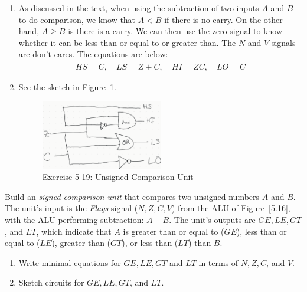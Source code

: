 \documentclass[12pt]{article}
\newenvironment{ex}[2][Exercise]{\begin{trivlist}
		\item[\hskip \labelsep {\bfseries #1}\hskip \labelsep {\bfseries #2.}]}{\end{trivlist}}
\newenvironment{sol}[1][Solution]{\begin{trivlist}
		\item[\hskip \labelsep {\bfseries #1:}]}{\end{trivlist}}
\begin{document}
\begin{sol}
	\begin{enumerate}[label=(\alph*)]
		\item As discussed in the text, when using the subtraction of two inputs
		$A$ and $B$ to do comparison, we know that $A<B$ if there is no carry.
		On the other hand, $A\geq B$ is there is a carry. We can then use
		the zero signal to know whether it can be less than or equal to or greater
		than. The $N$ and $V$ signals are don't-cares. The equations are below:
		\begin{align*}
			HS=C,\quad LS=Z+C,\quad HI=\bar{Z}C,\quad LO=\bar{C}
		\end{align*}
		\item See the sketch in Figure~\ref{unsigned-comparison-unit}.
		\begin{figure}
			\centering
			\includegraphics[width=0.5\textwidth]{exercise-05-19-unsigned-comparison-unit}
			\caption{Exercise 5-19: Unsigned Comparison Unit}
			\label{unsigned-comparison-unit}
		\end{figure}
	\end{enumerate}
\end{sol}

\begin{ex}{5.20}
	Build an \emph{signed comparison unit} that compares two unsigned numbers $A$ and $B$.
	The unit's input is the \emph{Flags} signal ($N, Z, C, V$) from the ALU of
	Figure~\ref{5.16}, with the ALU performing subtraction: $A-B$. The unit's outputs
	are $GE, LE, GT$, and $LT$, which indicate that $A$ is greater than or equal to
	($GE$), less than or equal to ($LE$), greater than ($GT$), or less than ($LT$) than $B$.
	\begin{enumerate}[label=(\alph*)]
		\item Write minimal equations for $GE, LE, GT$ and $LT$ in terms of $N, Z, C$,
		and $V$.
		\item Sketch circuits for $GE,LE,GT$, and $LT$.
	\end{enumerate}
\end{ex}
\end{document}
